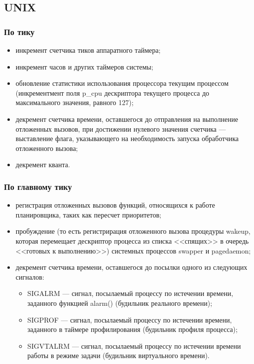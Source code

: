 \documentclass[a4paper,oneside,14pt]{extarticle}
\begin{document}
\subsection{UNIX}

\subsubsection{По тику}
\begin{itemize}
	\item инкремент счетчика тиков аппаратного таймера;
	\item инкремент часов и других таймеров системы;
	\item обновление статистики использования процессора текущим процессом (инкрементмент поля p\_cpu дескриптора текущего процесса до максимального значения, равного 127);
	\item декремент счетчика времени, оставшегося до отправления на выполнение отложенных вызовов, при достижении нулевого значения счетчика --- выставление флага, указывающего на необходимость запуска обработчика отложенного вызова;
    \item декремент кванта.
\end{itemize}

\subsubsection{По главному тику} 
\begin{itemize}
	\item регистрация отложенных вызовов функций, относящихся к работе планировщика,
	таких как пересчет приоритетов;
	\item пробуждение (то есть регистрирация отложенного вызова процедуры wakeup, которая перемещает дескриптор процесса из списка <<спящих>> в очередь <<готовых к выполнению>>) системных процессов swapper и pagedaemon;
	\item декремент счетчика времени, оставшегося до посылки одного из следующих сигналов:
	\begin{itemize}
		\item SIGALRM --- сигнал, посылаемый процессу по истечении времени, заданного функцией alarm() (будильник реального времени);
		\item SIGPROF --- сигнал, посылаемый процессу по истечении времени, заданного в таймере профилирования (будильник профиля процесса);
		\item SIGVTALRM --- сигнал, посылаемый процессу по истечении времени работы в режиме задачи (будильник виртуального времени).
	\end{itemize}
\end{itemize}
\end{document}
